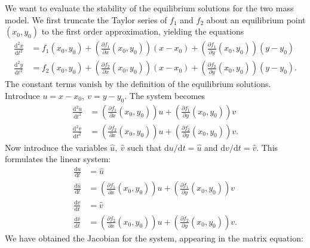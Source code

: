 \documentclass{article}
\begin{document}
We want to evaluate the stability of the equilibrium solutions for the two mass model.
We first truncate the Taylor series of \(f_1\) and \(f_2\) about an equilibrium point \((x_0,y_0)\) to the first order approximation, yielding the equations
\begin{equation}
    \begin{aligned}
        \frac{\mathrm{d}^2x}{\mathrm{d}t^2} &= f_1(x_0,y_0) + \left(\frac{\partial f_1}{\partial x}(x_0,y_0)\right)(x-x_0) + \left(\frac{\partial f_1}{\partial y}(x_0,y_0)\right)(y-y_0) \\
        \frac{\mathrm{d}^2y}{\mathrm{d}t^2} &= f_2(x_0,y_0) + \left(\frac{\partial f_2}{\partial x}(x_0,y_0)\right)(x-x_0) + \left(\frac{\partial f_2}{\partial y}(x_0,y_0)\right)(y-y_0).
    \end{aligned}
\end{equation}
The constant terms vanish by the definition of the equilibrium solutions. Introduce \(u = x-x_0,~v=y-y_0\). The system becomes
\begin{equation}
    \begin{aligned}
        \frac{\mathrm{d}^2u}{\mathrm{d}t^2} &= \left(\frac{\partial f_1}{\partial x}(x_0,y_0)\right)u + \left(\frac{\partial f_1}{\partial y}(x_0,y_0)\right)v \\
        \frac{\mathrm{d}^2v}{\mathrm{d}t^2} &= \left(\frac{\partial f_2}{\partial x}(x_0,y_0)\right)u + \left(\frac{\partial f_2}{\partial y}(x_0,y_0)\right)v.
    \end{aligned}
\end{equation}
Now introduce the variables $\hat{u},~\hat{v}$ such that \(\mathrm{d}u/\mathrm{d}t = \hat{u}\) and \(\mathrm{d}v/\mathrm{d}t = \hat{v}\). This formulates the linear system:
\begin{equation}
    \begin{aligned}
        \frac{\mathrm{d}u}{\mathrm{d}t} &= \hat{u} \\
        \frac{\mathrm{d}\hat{u}}{\mathrm{d}t} &= \left(\frac{\partial f_1}{\partial x}(x_0,y_0)\right)u + \left(\frac{\partial f_1}{\partial y}(x_0,y_0)\right)v \\
        \frac{\mathrm{d}v}{\mathrm{d}t} &= \hat{v} \\
        \frac{\mathrm{d}\hat{v}}{\mathrm{d}t} &= \left(\frac{\partial f_2}{\partial x}(x_0,y_0)\right)u + \left(\frac{\partial f_2}{\partial y}(x_0,y_0)\right)v.
    \end{aligned}
\end{equation}
We have obtained the Jacobian for the system, appearing in the matrix equation:
\end{document}
